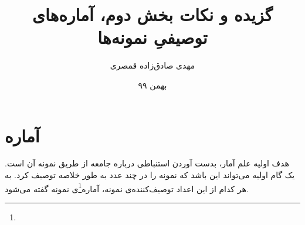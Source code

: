 \documentclass[12pt,onecolumn,a4paper]{article}
\begin{document}
\title{گزیده و نکات بخش دوم، آماره‌های توصیفیِ نمونه‌ها\\} 
\author{مهدی صادق‌زاده قمصری}
\date{بهمن ۹۹}
\maketitle

\section{آماره} 
هدف اولیه علم آمار، بدست آوردن استنباطی درباره جامعه از طریق نمونه آن است. یک گام اولیه می‌تواند این باشد که نمونه را در چند عدد به طور خلاصه توصیف کرد. به هر کدام از این اعداد توصیف‌کننده‌ی نمونه، آماره\footnote{}ی نمونه گفته می‌شود.
\end{document}
